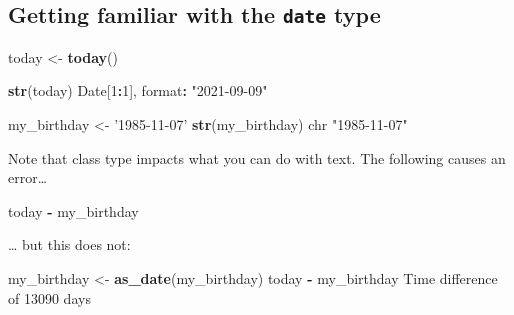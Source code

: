 \documentclass[
]{book}
\newenvironment{Shaded}{\begin{snugshade}}{\end{snugshade}}
\newcommand{\DecValTok}[1]{\textcolor[rgb]{0.00,0.00,0.81}{#1}}
\newcommand{\KeywordTok}[1]{\textcolor[rgb]{0.13,0.29,0.53}{\textbf{#1}}}
\newcommand{\NormalTok}[1]{#1}
\newcommand{\OperatorTok}[1]{\textcolor[rgb]{0.81,0.36,0.00}{\textbf{#1}}}
\newcommand{\StringTok}[1]{\textcolor[rgb]{0.31,0.60,0.02}{#1}}
\begin{document}
\hypertarget{getting-familiar-with-the-date-type}{%
\subsection*{\texorpdfstring{Getting familiar with the \texttt{date} type}{Getting familiar with the date type}}\label{getting-familiar-with-the-date-type}}

\begin{Shaded}
\begin{Highlighting}[]
\NormalTok{today <-}\StringTok{ }\KeywordTok{today}\NormalTok{()}
\end{Highlighting}
\end{Shaded}

\begin{Shaded}
\begin{Highlighting}[]
\KeywordTok{str}\NormalTok{(today)}
\NormalTok{ Date[}\DecValTok{1}\OperatorTok{:}\DecValTok{1}\NormalTok{], format}\OperatorTok{:}\StringTok{ "2021-09-09"}
\end{Highlighting}
\end{Shaded}

\begin{Shaded}
\begin{Highlighting}[]
\NormalTok{my_birthday <-}\StringTok{ '1985-11-07'}
\KeywordTok{str}\NormalTok{(my_birthday)}
\NormalTok{ chr }\StringTok{"1985-11-07"}
\end{Highlighting}
\end{Shaded}

Note that class type impacts what you can do with text. The following causes an error\ldots{}

\begin{Shaded}
\begin{Highlighting}[]
\NormalTok{today }\OperatorTok{-}\StringTok{ }\NormalTok{my_birthday}
\end{Highlighting}
\end{Shaded}

\ldots{} but this does not:

\begin{Shaded}
\begin{Highlighting}[]
\NormalTok{my_birthday <-}\StringTok{ }\KeywordTok{as_date}\NormalTok{(my_birthday)}
\NormalTok{today }\OperatorTok{-}\StringTok{ }\NormalTok{my_birthday}
\NormalTok{Time difference of }\DecValTok{13090}\NormalTok{ days}
\end{Highlighting}
\end{Shaded}
\end{document}
